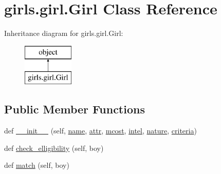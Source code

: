 \hypertarget{classgirls_1_1girl_1_1_girl}{}\section{girls.\+girl.\+Girl Class Reference}
\label{classgirls_1_1girl_1_1_girl}
Inheritance diagram for girls.\+girl.\+Girl\+:\begin{figure}[H]
\begin{center}
\leavevmode
\includegraphics[height=2.000000cm]{classgirls_1_1girl_1_1_girl}
\end{center}
\end{figure}
\subsection*{Public Member Functions}
\begin{DoxyCompactItemize}
\item 
def \hyperlink{classgirls_1_1girl_1_1_girl_a4b982b24b3c96dd053b47cf7d7c21393}{\+\_\+\+\_\+init\+\_\+\+\_\+} (self, \hyperlink{classgirls_1_1girl_1_1_girl_a9240f842435b25ad794b419ff9d32ef4}{name}, \hyperlink{classgirls_1_1girl_1_1_girl_a5ce2777085f6b756ed283669645109d2}{attr}, \hyperlink{classgirls_1_1girl_1_1_girl_a95193cb59f14d7ff3c149a9c92bd9a24}{mcost}, \hyperlink{classgirls_1_1girl_1_1_girl_a11bb864cf299a2406c3ae21e9d3fbcf5}{intel}, \hyperlink{classgirls_1_1girl_1_1_girl_a4cb999073362cd0620d14b749121d270}{nature}, \hyperlink{classgirls_1_1girl_1_1_girl_a6321f0bee18e529333abe592a4e99a8b}{criteria})
\item 
def \hyperlink{classgirls_1_1girl_1_1_girl_a1590e415be1fc9fd963232ea64819b95}{check\+\_\+elligibility} (self, boy)
\item 
def \hyperlink{classgirls_1_1girl_1_1_girl_aa10461bb48b6988ca57d67590995bb37}{match} (self, boy)
\end{DoxyCompactItemize}
